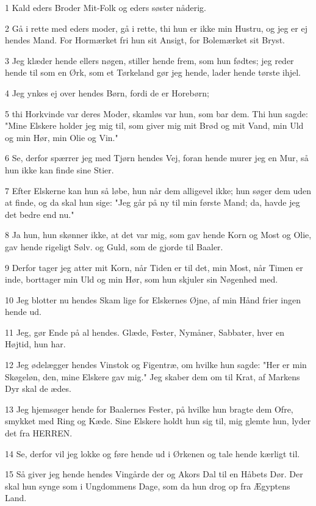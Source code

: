 \par 1 Kald eders Broder Mit-Folk og eders søster nåderig.
\par 2 Gå i rette med eders moder, gå i rette, thi hun er ikke min Hustru, og jeg er ej hendes Mand. For Hormærket fri hun sit Ansigt, for Bolemærket sit Bryst.
\par 3 Jeg klæder hende ellers nøgen, stiller hende frem, som hun fødtes; jeg reder hende til som en Ørk, som et Tørkeland gør jeg hende, lader hende tørste ihjel.
\par 4 Jeg ynkes ej over hendes Børn, fordi de er Horebørn;
\par 5 thi Horkvinde var deres Moder, skamløs var hun, som bar dem. Thi hun sagde: "Mine Elskere holder jeg mig til, som giver mig mit Brød og mit Vand, min Uld og min Hør, min Olie og Vin."
\par 6 Se, derfor spærrer jeg med Tjørn hendes Vej, foran hende murer jeg en Mur, så hun ikke kan finde sine Stier.
\par 7 Efter Elskerne kan hun så løbe, hun når dem alligevel ikke; hun søger dem uden at finde, og da skal hun sige: "Jeg går på ny til min første Mand; da, havde jeg det bedre end nu."
\par 8 Ja hun, hun skønner ikke, at det var mig, som gav hende Korn og Most og Olie, gav hende rigeligt Sølv. og Guld, som de gjorde til Baaler.
\par 9 Derfor tager jeg atter mit Korn, når Tiden er til det, min Most, når Timen er inde, borttager min Uld og min Hør, som hun skjuler sin Nøgenhed med.
\par 10 Jeg blotter nu hendes Skam lige for Elskernes Øjne, af min Hånd frier ingen hende ud.
\par 11 Jeg, gør Ende på al hendes. Glæde, Fester, Nymåner, Sabbater, hver en Højtid, hun har.
\par 12 Jeg ødelægger hendes Vinstok og Figentræ, om hvilke hun sagde: "Her er min Skøgeløn, den, mine Elskere gav mig." Jeg skaber dem om til Krat, af Markens Dyr skal de ædes.
\par 13 Jeg hjemsøger hende for Baalernes Fester, på hvilke hun bragte dem Ofre, smykket med Ring og Kæde. Sine Elskere holdt hun sig til, mig glemte hun, lyder det fra HERREN.
\par 14 Se, derfor vil jeg lokke og føre hende ud i Ørkenen og tale hende kærligt til.
\par 15 Så giver jeg hende hendes Vingårde der og Akors Dal til en Håbets Dør. Der skal hun synge som i Ungdommens Dage, som da hun drog op fra Ægyptens Land.
